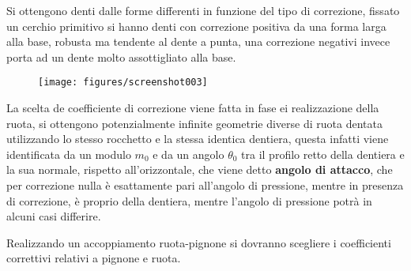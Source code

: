 \documentclass[a4paper, 15pt]{article}
\begin{document}
\begin{adjustwidth}{2in}{}
				Si ottengono denti dalle forme differenti in funzione del tipo di correzione,  fissato un cerchio primitivo si hanno denti con correzione positiva da una forma larga alla base, robusta ma tendente al dente a punta, una correzione negativi invece porta ad un dente molto assottigliato alla base. 
				\begin{figure}[H]
					\centering
					\texttt{[image: figures/screenshot003]}
					\label{fig:screenshot003}
				\end{figure}				
				La scelta de coefficiente di correzione viene fatta in fase ei realizzazione della ruota, si ottengono potenzialmente infinite  geometrie diverse di ruota dentata utilizzando lo stesso rocchetto e la stessa identica dentiera, questa infatti viene identificata da un modulo $m_0$ e da un angolo $\theta_0$ tra il profilo retto della dentiera e la sua normale, rispetto all'orizzontale, che viene detto \textbf{angolo di attacco}, che per correzione nulla è esattamente pari all'angolo di pressione, mentre in presenza di correzione, è proprio della dentiera, mentre l'angolo di pressione potrà in alcuni casi differire. \newline 
				
				Realizzando un accoppiamento ruota-pignone si dovranno scegliere i coefficienti correttivi relativi a pignone e ruota. 
\end{adjustwidth}
\end{document}
